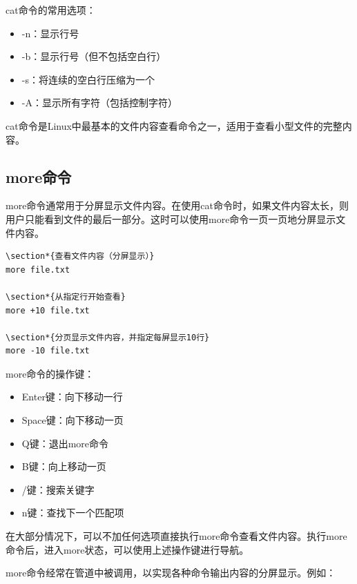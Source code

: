 \documentclass[12pt,UTF8]{ctexbook}
\begin{document}
cat命令的常用选项：
\begin{itemize}
    \item -n：显示行号
    \item -b：显示行号（但不包括空白行）
    \item -s：将连续的空白行压缩为一个
    \item -A：显示所有字符（包括控制字符）
\end{itemize}

cat命令是Linux中最基本的文件内容查看命令之一，适用于查看小型文件的完整内容。

\subsection{more命令}
more命令通常用于分屏显示文件内容。在使用cat命令时，如果文件内容太长，则用户只能看到文件的最后一部分。这时可以使用more命令一页一页地分屏显示文件内容。

\begin{verbatim}
\section*{查看文件内容（分屏显示）}
more file.txt

\section*{从指定行开始查看}
more +10 file.txt

\section*{分页显示文件内容，并指定每屏显示10行}
more -10 file.txt
\end{verbatim}

more命令的操作键：
\begin{itemize}
    \item Enter键：向下移动一行
    \item Space键：向下移动一页
    \item Q键：退出more命令
    \item B键：向上移动一页
    \item /键：搜索关键字
    \item n键：查找下一个匹配项
\end{itemize}

在大部分情况下，可以不加任何选项直接执行more命令查看文件内容。执行more命令后，进入more状态，可以使用上述操作键进行导航。

more命令经常在管道中被调用，以实现各种命令输出内容的分屏显示。例如：
\end{document}
